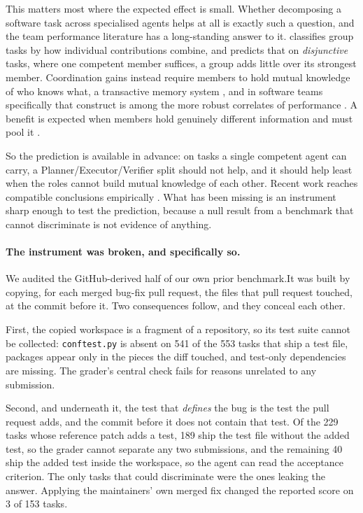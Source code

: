 \documentclass[11pt]{article}
\newif\ifanon
\begin{document}
This matters most where the expected effect is small. Whether decomposing a
software task across specialised agents helps at all is exactly such a question,
and the team performance literature has a long-standing answer to it.
\citet{steiner1972group} classifies group tasks by how individual contributions
combine, and predicts that on \emph{disjunctive} tasks, where one competent
member suffices, a group adds little over its strongest member. Coordination
gains instead require members to hold mutual knowledge of who knows what, a
transactive memory system \citep{wegner1987transactive,lewis2003measuring}, and
in software teams specifically that construct is among the more robust
correlates of performance \citep{faraj2000coordinating}. A benefit is expected
when members hold genuinely different information and must pool it
\citep{stasser1985pooling}.

So the prediction is available in advance: on tasks a single competent agent can
carry, a Planner/Executor/Verifier split should not help, and it should help
least when the roles cannot build mutual knowledge of each other. Recent work
reaches compatible conclusions empirically \citep{cemri2025why}. What has been
missing is an instrument sharp enough to test the prediction, because a null
result from a benchmark that cannot discriminate is not evidence of anything.

\paragraph{The instrument was broken, and specifically so.} We audited the
GitHub-derived half of our own prior benchmark.\ifanon\footnote{The benchmark's
name is masked for review. It is a public artifact of ours, so naming it would
identify the authors, and we keep the first person because the corpus in which
this audit finds the most severe defects being our own is material to how the
audit should be read.}\fi It was built by copying, for
each merged bug-fix pull request, the files that pull request touched, at the
commit before it. Two consequences follow, and they conceal each other.

First, the copied workspace is a fragment of a repository, so its test suite
cannot be collected: \texttt{conftest.py} is absent on 541 of the 553 tasks that
ship a test file, packages appear only in the pieces the diff touched, and
test-only dependencies are missing. The grader's central check fails for reasons
unrelated to any submission.

Second, and underneath it, the test that \emph{defines} the bug is the test the
pull request adds, and the commit before it does not contain that test. Of the
229 tasks whose reference patch adds a test, 189 ship the test file without the
added test, so the grader cannot separate any two submissions, and the remaining
40 ship the added test inside the workspace, so the agent can read the
acceptance criterion. The only tasks that could discriminate were the ones
leaking the answer. Applying the maintainers' own merged fix changed the reported
score on 3 of 153 tasks.
\end{document}
